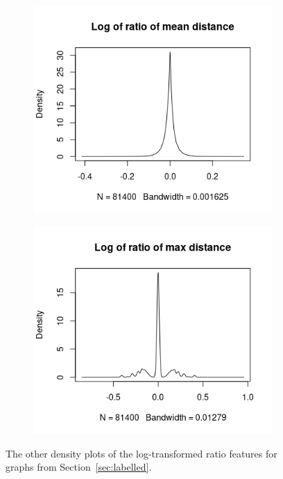 \documentclass{l4proj}
\theoremstyle{definition}
\theoremstyle{remark}
\begin{document}
\begin{figure}
\begin{subfigure}[t]{0.49\textwidth}
    \centering
    \includegraphics[width=\textwidth]{images/mcs_ratio_meandist.png}
  \end{subfigure}
  \begin{subfigure}[t]{0.49\textwidth}
    \centering
    \includegraphics[width=\textwidth]{images/mcs_ratio_maxdist.png}
  \end{subfigure}
  \caption{The other density plots of the log-transformed ratio features for
    graphs from Section~\ref{sec:labelled}.}
  \label{fig:mcs_ratio}
\end{figure}
\end{document}
